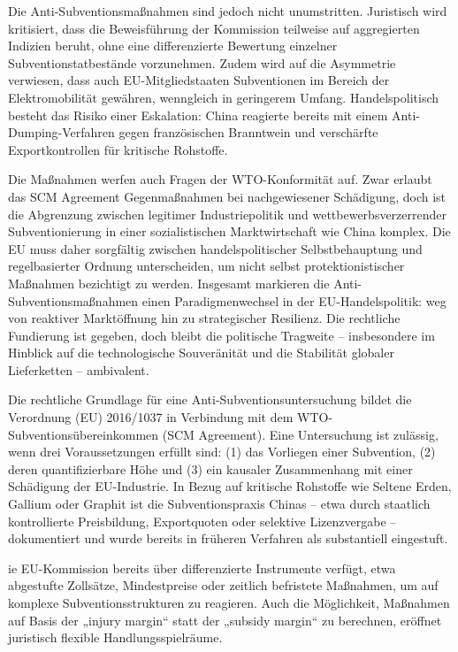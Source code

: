 \documentclass[12pt,a4paper,oneside]{book} %
\begin{document}
Die Anti-Subventionsmaßnahmen sind jedoch nicht unumstritten. Juristisch wird kritisiert, dass die Beweisführung der Kommission teilweise auf aggregierten Indizien beruht, ohne eine differenzierte Bewertung einzelner Subventionstatbestände vorzunehmen. Zudem wird auf die Asymmetrie verwiesen, dass auch EU-Mitgliedstaaten Subventionen im Bereich der Elektromobilität gewähren, wenngleich in geringerem Umfang. Handelspolitisch besteht das Risiko einer Eskalation: China reagierte bereits mit einem Anti-Dumping-Verfahren gegen französischen Branntwein und verschärfte Exportkontrollen für kritische Rohstoffe.

Die Maßnahmen werfen auch Fragen der WTO-Konformität auf. Zwar erlaubt das SCM Agreement Gegenmaßnahmen bei nachgewiesener Schädigung, doch ist die Abgrenzung zwischen legitimer Industriepolitik und wettbewerbsverzerrender Subventionierung in einer sozialistischen Marktwirtschaft wie China komplex. Die EU muss daher sorgfältig zwischen handelspolitischer Selbstbehauptung und regelbasierter Ordnung unterscheiden, um nicht selbst protektionistischer Maßnahmen bezichtigt zu werden.
Insgesamt markieren die Anti-Subventionsmaßnahmen einen Paradigmenwechsel in der EU-Handelspolitik: weg von reaktiver Marktöffnung hin zu strategischer Resilienz. Die rechtliche Fundierung ist gegeben, doch bleibt die politische Tragweite – insbesondere im Hinblick auf die technologische Souveränität und die Stabilität globaler Lieferketten – ambivalent.

Die rechtliche Grundlage für eine Anti-Subventionsuntersuchung bildet die Verordnung (EU) 2016/1037 in Verbindung mit dem WTO-Subventionsübereinkommen (SCM Agreement). Eine Untersuchung ist zulässig, wenn drei Voraussetzungen erfüllt sind: (1) das Vorliegen einer Subvention, (2) deren quantifizierbare Höhe und (3) ein kausaler Zusammenhang mit einer Schädigung der EU-Industrie. In Bezug auf kritische Rohstoffe wie Seltene Erden, Gallium oder Graphit ist die Subventionspraxis Chinas – etwa durch staatlich kontrollierte Preisbildung, Exportquoten oder selektive Lizenzvergabe – dokumentiert und wurde bereits in früheren Verfahren als substantiell eingestuft.

ie EU-Kommission bereits über differenzierte Instrumente verfügt, etwa abgestufte Zollsätze, Mindestpreise oder zeitlich befristete Maßnahmen, um auf komplexe Subventionsstrukturen zu reagieren. Auch die Möglichkeit, Maßnahmen auf Basis der „injury margin“ statt der „subsidy margin“ zu berechnen, eröffnet juristisch flexible Handlungsspielräume.
\end{document}
